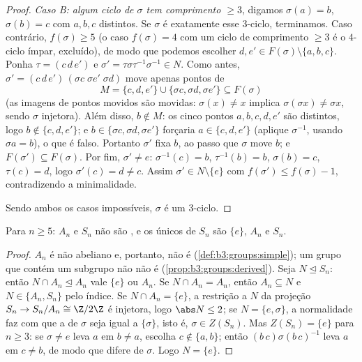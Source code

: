 \begin{proof}
\emph{Caso B: algum ciclo de $\sigma$ tem comprimento
$\geq 3$}, digamos $\sigma(a) = b$, $\sigma(b) = c$ com $a, b, c$ distintos. Se
$\sigma$ é exatamente esse $3$-ciclo, terminamos. Caso
contrário, $f(\sigma) \geq 5$ (o caso $f(\sigma) = 4$ com um ciclo de comprimento
$\geq3$ é o $4$-ciclo ímpar, excluído), de modo que podemos
escolher $d, e' \in
F(\sigma) \setminus \{a, b, c\}$. Ponha $\tau = (c\,d\,e')$ e $\sigma' = \tau\sigma\tau^{-1}\sigma^{-1} \in N$. Como antes, $\sigma' = (c\,d\,e')\,(\sigma c\;\sigma e'\;\sigma d)$ move apenas
pontos de
\[
M = \{c, d, e'\} \cup \{\sigma c, \sigma d, \sigma e'\}
\subseteq F(\sigma)
\]
(as imagens de pontos movidos são movidas: $\sigma(x) \ne x$ implica $\sigma(\sigma x) \neq \sigma x$, sendo
$\sigma$ injetora). Além disso, $b \notin M$: os cinco pontos $a, b, c, d, e'$ são
distintos, logo $b
\notin \{c, d, e'\}$; e $b \in \{\sigma c, \sigma d, \sigma
e'\}$ forçaria $a \in \{c, d, e'\}$ (aplique $\sigma^{-1}$, usando
$\sigma a = b$), o que é falso. Portanto $\sigma'$ fixa $b$, ao passo que
$\sigma$ move $b$; e $F(\sigma') \subseteq F(\sigma)$. Por fim, $\sigma' \neq e$: $\sigma^{-1}(c) = b$, $\tau^{-1}(b) = b$,
$\sigma(b) = c$, $\tau(c) = d$, logo $\sigma'(c) = d \neq c$. Assim $\sigma' \in N
\setminus \{e\}$ com $f(\sigma') \leq f(\sigma) - 1$, contradizendo a
minimalidade.

Sendo ambos os casos impossíveis, $\sigma$ é um $3$-ciclo.
\end{proof}

\begin{corollary}\label{cor:b3:groups:snnotsolvable}
Para $n \geq 5$: $A_n$ e $S_n$ não são , e os únicos
 de $S_n$ são $\{e\}$, $A_n$ e $S_n$.
\end{corollary}

\begin{proof}
$A_n$ é  não abeliano e, portanto, não é 
(\cref{def:b3:groups:simple}); um grupo que contém um subgrupo não  não é
 (\cref{prop:b3:groups:derived}). Seja $N
\trianglelefteq S_n$: então $N \cap A_n \trianglelefteq A_n$ vale $\{e\}$ ou
$A_n$. Se $N \cap A_n = A_n$, então $A_n \subseteq N$ e $N \in \{A_n, S_n\}$ pelo índice. Se $N \cap A_n = \{e\}$, a
restrição a $N$ da projeção $S_n \to S_n/A_n \cong
\Z/2\Z$ é injetora, logo $\abs N \leq 2$; se $N = \{e, \sigma\}$,
a normalidade faz com que a  de $\sigma$ seja
igual a $\{\sigma\}$, isto é, $\sigma \in Z(S_n)$. Mas $Z(S_n) = \{e\}$ para $n \geq 3$: se $\sigma \ne e$ leva
$a$ em $b \neq a$, escolha $c
\notin \{a, b\}$; então $(b\,c)\sigma(b\,c)^{-1}$ leva $a$ em $c
\ne b$, de
modo que difere de $\sigma$. Logo $N = \{e\}$.
\end{proof}

